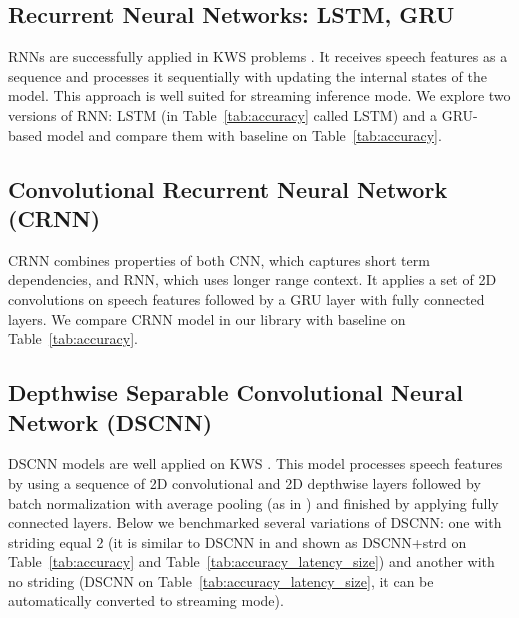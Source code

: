 \documentclass[a4paper]{article}
\begin{document}
\subsection{Recurrent Neural Networks: LSTM, GRU}
RNNs\cite{LSTM1} are successfully applied in KWS problems \cite{CRNN, LSTM5}. It receives speech features as a sequence and processes it sequentially with updating the internal states of the model. This approach is well suited for streaming inference mode. We explore two versions of RNN: LSTM \cite{LSTMP} (in Table~\ref{tab:accuracy} called LSTM) and a GRU-based model \cite{GRU1} and compare them with baseline \cite{HELLO} on Table~\ref{tab:accuracy}.

\subsection{Convolutional Recurrent Neural Network (CRNN)}
CRNN\cite{CRNN} combines properties of both CNN, which captures short term dependencies, and RNN, which uses longer range context. It applies a set of 2D convolutions on speech features followed by a GRU layer with fully connected layers. We compare CRNN model in our library with baseline \cite{HELLO} on Table~\ref{tab:accuracy}.

\subsection{Depthwise Separable Convolutional Neural Network (DSCNN)}
DSCNN\cite{DS_CNN} models are well applied on KWS \cite{HELLO}. This model processes speech features by using a sequence of 2D convolutional and 2D depthwise layers followed by batch normalization with average pooling (as in \cite{HELLO}) and finished by applying fully connected layers. Below we benchmarked several variations of DSCNN: one with striding equal 2 (it is similar to DSCNN in \cite{HELLO} and shown as DSCNN+strd on Table~\ref{tab:accuracy} and Table~\ref{tab:accuracy_latency_size}) and another with no striding (DSCNN on Table~\ref{tab:accuracy_latency_size}, it can be automatically converted to streaming mode).
\end{document}
